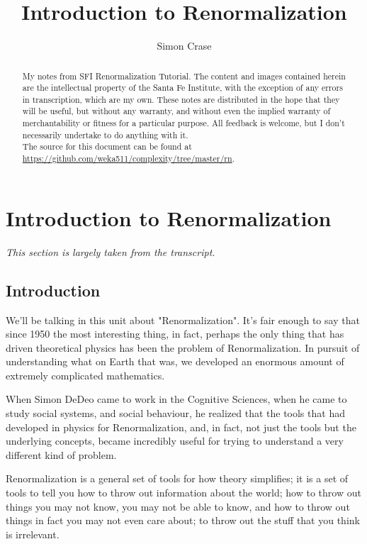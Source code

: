 \documentclass[]{article}
\title{Introduction to Renormalization}
\author{Simon Crase}
\begin{document}
\maketitle

\begin{abstract}
My notes from SFI Renormalization Tutorial\cite{dedeo2017renormalization}.
The content and images contained herein are the intellectual property of the Santa Fe Institute, with the exception of any errors in transcription, which are my own. These notes are distributed in the hope that they will be useful,  but without any warranty, and without even the implied warranty of merchantability or fitness for a particular purpose. All feedback is welcome,  but I don't necessarily undertake to do anything with it.\\
The source for this document can be found at\\
\url{https://github.com/weka511/complexity/tree/master/rn}.
\end{abstract}

\tableofcontents
\listoffigures
\listoftables
{}

\section{Introduction to Renormalization}

\textit{This section is largely taken from the transcript.}

\subsection{Introduction}

We'll be talking in this unit about "Renormalization". It's fair enough to say that since 1950 the most interesting thing, in fact, perhaps the only thing that has driven theoretical physics has been the problem of Renormalization. In pursuit of understanding what on Earth that was, we developed an enormous amount of extremely complicated mathematics.

When Simon DeDeo came to work in the Cognitive Sciences, when he came to study social systems, and social behaviour,  he realized  that the tools that had developed in physics for Renormalization, and, in fact, not just the tools but the underlying concepts, became incredibly useful for trying to understand a very different kind of problem.

Renormalization is a general set of tools for how theory simplifies; it is a set of tools to tell you how to throw out information about the world; how to throw out things you may not know, you may not be able to know, and how to throw out 
things in fact you may not even care about; to throw out the stuff that you think is irrelevant.
\end{document}
